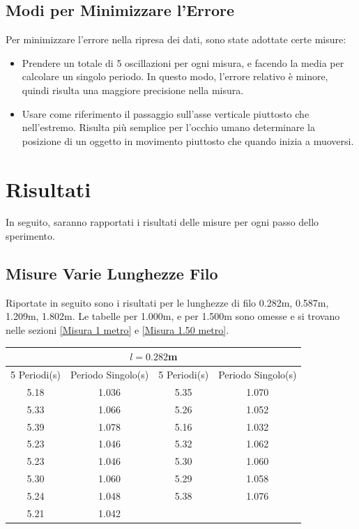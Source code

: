 \documentclass[a4paper]{article}
\begin{document}
\subsection{Modi per Minimizzare l'Errore}
Per minimizzare l'errore nella ripresa dei dati, sono state adottate certe misure:
\begin{itemize}
    \item Prendere un totale di 5 oscillazioni per ogni misura, e facendo la media per calcolare un singolo periodo. In questo modo, l'errore relativo è minore, quindi risulta una maggiore precisione nella misura. 
    \item Usare come riferimento il passaggio sull'asse verticale piuttosto che nell'estremo. Risulta più semplice per l'occhio umano determinare la posizione di un oggetto in movimento piuttosto che quando inizia a muoversi.
\end{itemize}

\section{Risultati}
In seguito, saranno rapportati i risultati delle misure per ogni passo dello sperimento.
\subsection{Misure Varie Lunghezze Filo}
Riportate in seguito sono i risultati per le lunghezze di filo 0.282m, 0.587m, 1.209m, 1.802m. Le tabelle per 1.000m, e per 1.500m sono omesse e si trovano nelle sezioni \ref{Misura 1 metro} e \ref{Misura 1.50 metro}.
\begin{center}
    \begin{tabular}{|c|c|c|c|}
    \hline
    \multicolumn{4}{|c|}{$l=0.282$m} \\
    \hline
    5 Periodi(s) & Periodo Singolo(s) & 5 Periodi(s) & Periodo Singolo(s) \\
    \hline
     5.18 & 1.036 & 5.35 & 1.070 \\
     5.33 & 1.066 & 5.26 & 1.052 \\
     5.39 & 1.078 & 5.16 & 1.032 \\
     5.23 & 1.046 & 5.32 & 1.062 \\
     5.23 & 1.046 & 5.30 & 1.060 \\
     5.30 & 1.060 & 5.29 & 1.058 \\
     5.24 & 1.048 & 5.38 & 1.076 \\ 
     5.21 & 1.042 & & \\
    \hline
    \end{tabular}
\end{center}
\end{document}
